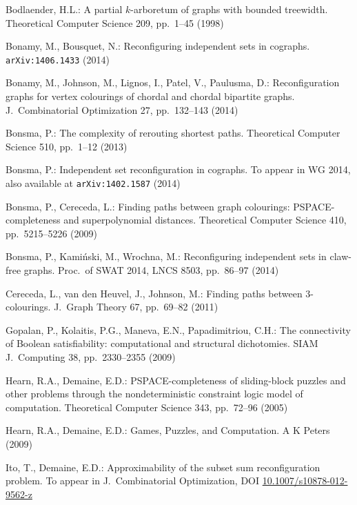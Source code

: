 \documentclass{llncs}
\begin{document}

\begin{thebibliography}{10}

Bodlaender, H.L.:
A partial $k$-arboretum of graphs with bounded treewidth.
Theoretical Computer Science 209, pp.~1--45 (1998)

Bonamy, M., Bousquet, N.:
Reconfiguring independent sets in cographs.
{\tt arXiv:1406.1433} (2014)
   
Bonamy, M., Johnson, M., Lignos, I., Patel, V., Paulusma, D.: 
Reconfiguration graphs for vertex colourings of chordal and chordal bipartite graphs. 
J.~Combinatorial Optimization 27, pp.~132--143 (2014)

Bonsma, P.: 
The complexity of rerouting shortest paths. 
Theoretical Computer Science 
510, pp.~1--12 (2013)

Bonsma, P.: 
Independent set reconfiguration in cographs. 
To appear in WG 2014, also available at {\tt arXiv:1402.1587} (2014)

Bonsma, P., Cereceda, L.: 
Finding paths between graph colourings: PSPACE-completeness and superpolynomial distances. 
Theoretical Computer Science 
410, pp.~5215--5226 (2009)  

Bonsma, P., Kami\'nski, M., Wrochna, M.: 
Reconfiguring independent sets in claw-free graphs.
Proc.~of SWAT 2014, LNCS 8503, pp.~86--97 (2014)


Cereceda, L., van den Heuvel, J., Johnson, M.:  
Finding paths between 3-colourings. 
J.~Graph Theory 67, pp.~69--82 (2011)

Gopalan, P., Kolaitis, P.G., Maneva, E.N., Papadimitriou, C.H.:
The connectivity of Boolean satisfiability: computational and structural dichotomies.
SIAM J.~Computing 38, pp.~2330--2355 (2009)  

Hearn, R.A., Demaine, E.D.: 
PSPACE-completeness of sliding-block puzzles and other problems through the nondeterministic constraint logic model of computation. 
Theoretical Computer Science 
343, pp.~72--96 (2005) 

Hearn, R.A., Demaine, E.D.: 
Games, Puzzles, and Computation.
A K Peters (2009)

Ito, T., Demaine, E.D.:
Approximability of the subset sum reconfiguration problem.
To appear in J.~Combinatorial Optimization, DOI \url{10.1007/s10878-012-9562-z}


\end{thebibliography}
\end{document}
